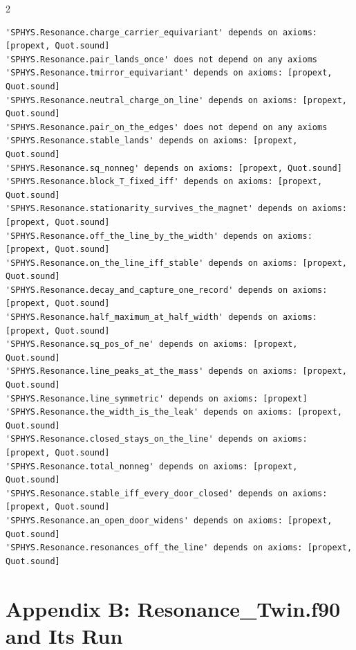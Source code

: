 \documentclass[10pt]{article}
\begin{document}
\begin{multicols}{2}
\begin{Verbatim}[fontsize=\fontsize{5.9}{6.8}\selectfont,breaklines,breakanywhere,breaksymbolleft={}]
'SPHYS.Resonance.charge_carrier_equivariant' depends on axioms: [propext, Quot.sound]
'SPHYS.Resonance.pair_lands_once' does not depend on any axioms
'SPHYS.Resonance.tmirror_equivariant' depends on axioms: [propext, Quot.sound]
'SPHYS.Resonance.neutral_charge_on_line' depends on axioms: [propext, Quot.sound]
'SPHYS.Resonance.pair_on_the_edges' does not depend on any axioms
'SPHYS.Resonance.stable_lands' depends on axioms: [propext, Quot.sound]
'SPHYS.Resonance.sq_nonneg' depends on axioms: [propext, Quot.sound]
'SPHYS.Resonance.block_T_fixed_iff' depends on axioms: [propext, Quot.sound]
'SPHYS.Resonance.stationarity_survives_the_magnet' depends on axioms: [propext, Quot.sound]
'SPHYS.Resonance.off_the_line_by_the_width' depends on axioms: [propext, Quot.sound]
'SPHYS.Resonance.on_the_line_iff_stable' depends on axioms: [propext, Quot.sound]
'SPHYS.Resonance.decay_and_capture_one_record' depends on axioms: [propext, Quot.sound]
'SPHYS.Resonance.half_maximum_at_half_width' depends on axioms: [propext, Quot.sound]
'SPHYS.Resonance.sq_pos_of_ne' depends on axioms: [propext, Quot.sound]
'SPHYS.Resonance.line_peaks_at_the_mass' depends on axioms: [propext, Quot.sound]
'SPHYS.Resonance.line_symmetric' depends on axioms: [propext]
'SPHYS.Resonance.the_width_is_the_leak' depends on axioms: [propext, Quot.sound]
'SPHYS.Resonance.closed_stays_on_the_line' depends on axioms: [propext, Quot.sound]
'SPHYS.Resonance.total_nonneg' depends on axioms: [propext, Quot.sound]
'SPHYS.Resonance.stable_iff_every_door_closed' depends on axioms: [propext, Quot.sound]
'SPHYS.Resonance.an_open_door_widens' depends on axioms: [propext, Quot.sound]
'SPHYS.Resonance.resonances_off_the_line' depends on axioms: [propext, Quot.sound]
\end{Verbatim}
\end{multicols}

\hypertarget{appendix-b-resonance_twin.f90-and-its-run}{%
\section{Appendix B: Resonance\_Twin.f90 and Its
Run}\label{appendix-b-resonance_twin.f90-and-its-run}}
\end{document}
